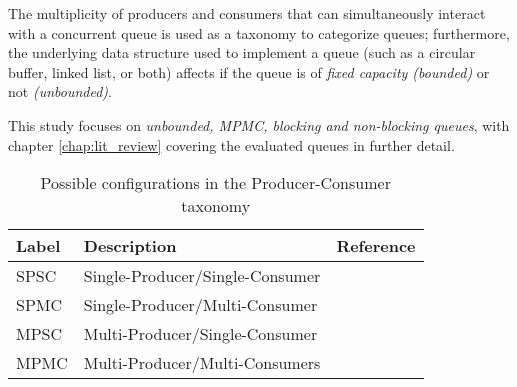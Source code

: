The multiplicity of producers and
consumers that can simultaneously interact with a concurrent queue is used as a
taxonomy to categorize queues;
furthermore, the underlying data structure used to implement a queue (such as a
circular buffer, linked list, or both) affects if the queue is of \emph{fixed
capacity (bounded)} or not \emph{(unbounded)}. 

This study focuses on \emph{unbounded, MPMC, blocking and
non-blocking queues}, with chapter \ref{chap:lit_review} covering the evaluated
queues in further detail.

\begin{table*}[h]\centering
\caption{Possible configurations in the Producer-Consumer taxonomy}\label{tab:producer_consumer}
    \begin{tabular}{lll}
        \hline
        Label & Description & Reference \\ \hline
        SPSC & Single-Producer/Single-Consumer & \citep{aldinucci2012efficient} \\
        SPMC & Single-Producer/Multi-Consumer & \citep{arnautov2017ffq} \\
        MPSC & Multi-Producer/Single-Consumer & \\
        MPMC & Multi-Producer/Multi-Consumers & \citep{michael1996simple,valois1994queues,hoffman2007baskets}\\ \hline
    \end{tabular}        
\end{table*}



